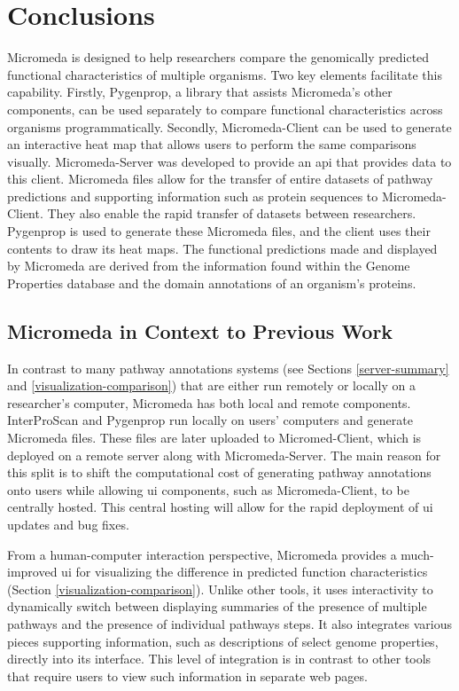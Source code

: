 \chapter{Conclusions} \label{conclusion-chapter}

Micromeda is designed to help researchers compare the genomically predicted functional characteristics of multiple organisms. Two key elements facilitate this capability. Firstly, Pygenprop, a library that assists Micromeda's other components, can be used separately to compare functional characteristics across organisms programmatically. Secondly, Micromeda-Client can be used to generate an interactive heat map that allows users to perform the same comparisons visually. Micromeda-Server was developed to provide an \gls{api} that provides data to this client. Micromeda files allow for the transfer of entire datasets of pathway predictions and supporting information such as protein sequences to Micromeda-Client. They also enable the rapid transfer of datasets between researchers. Pygenprop is used to generate these Micromeda files, and the client uses their contents to draw its heat maps. The functional predictions made and displayed by Micromeda are derived from the information found within the Genome Properties database and the domain annotations of an organism's proteins. 

\section{Micromeda in Context to Previous Work}

In contrast to many pathway annotations systems (see Sections \ref{server-summary} and \ref{visualization-comparison}) that are either run remotely or locally on a researcher's computer, Micromeda has both local and remote components. InterProScan and Pygenprop run locally on users' computers and generate Micromeda files. These files are later uploaded to Micromed-Client, which is deployed on a remote server along with Micromeda-Server. The main reason for this split is to shift the computational cost of generating pathway annotations onto users while allowing \gls{ui} components, such as Micromeda-Client, to be centrally hosted. This central hosting will allow for the rapid deployment of \gls{ui} updates and bug fixes.

From a human-computer interaction perspective, Micromeda provides a much-improved \gls{ui} for visualizing the difference in predicted function characteristics (Section \ref{visualization-comparison}). Unlike other tools, it uses interactivity to dynamically switch between displaying summaries of the presence of multiple pathways and the presence of individual pathways steps. It also integrates various pieces supporting information, such as descriptions of select genome properties, directly into its interface. This level of integration is in contrast to other tools that require users to view such information in separate web pages.


